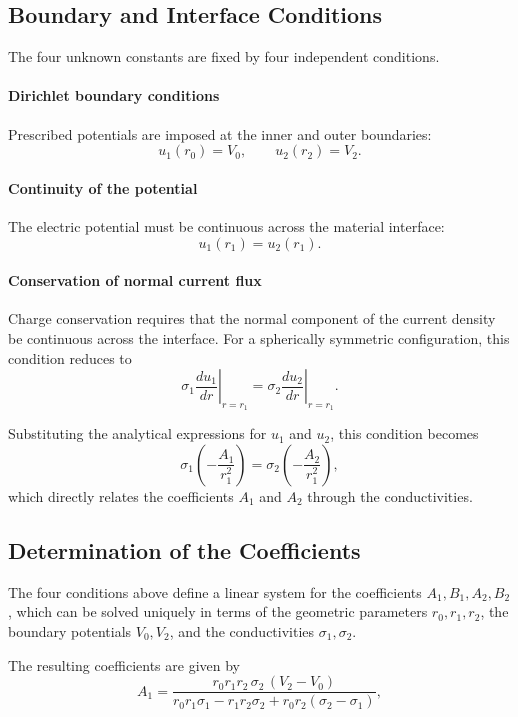 \subsection{Boundary and Interface Conditions}

The four unknown constants are fixed by four independent conditions.

\paragraph*{Dirichlet boundary conditions}
Prescribed potentials are imposed at the inner and outer boundaries:
\[
u_1(r_0) = V_0, \qquad u_2(r_2) = V_2.
\]

\paragraph*{Continuity of the potential}
The electric potential must be continuous across the material interface:
\[
u_1(r_1) = u_2(r_1).
\]

\paragraph*{Conservation of normal current flux}
Charge conservation requires that the normal component of the current density be continuous across the interface. For a spherically symmetric configuration, this condition reduces to
\[
\sigma_1 \left.\frac{du_1}{dr}\right|_{r=r_1}
=
\sigma_2 \left.\frac{du_2}{dr}\right|_{r=r_1}.
\]

Substituting the analytical expressions for $u_1$ and $u_2$, this condition becomes
\[
\sigma_1 \left(-\frac{A_1}{r_1^2}\right)
=
\sigma_2 \left(-\frac{A_2}{r_1^2}\right),
\]
which directly relates the coefficients $A_1$ and $A_2$ through the conductivities.

\subsection{Determination of the Coefficients}

The four conditions above define a linear system for the coefficients $A_1, B_1, A_2, B_2$, which can be solved uniquely in terms of the geometric parameters $r_0, r_1, r_2$, the boundary potentials $V_0, V_2$, and the conductivities $\sigma_1, \sigma_2$.

The resulting coefficients are given by
\[
A_1 =
\frac{
r_0 r_1 r_2 \, \sigma_2 \, (V_2 - V_0)
}{
r_0 r_1 \sigma_1 - r_1 r_2 \sigma_2 + r_0 r_2 (\sigma_2 - \sigma_1)
},
\]

